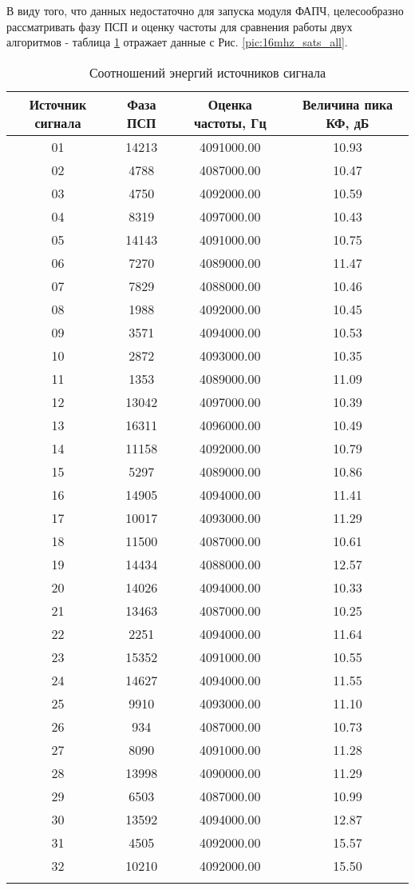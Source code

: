 В виду того, что данных недостаточно для запуска модуля ФАПЧ, целесообразно рассматривать фазу ПСП и оценку частоты для сравнения работы двух
алгоритмов - таблица \ref{tbl:16mhz_sats_all} отражает данные с Рис. \ref{pic:16mhz_sats_all}.
\begin{center}
	\begin{longtable}{ | c | c | c | c |}
	\hline
	Источник сигнала & Фаза ПСП & Оценка частоты, Гц & Величина пика КФ, дБ \\ \hline
	01 & 14213	& 4091000.00	& 10.93 \\ \hline 
	02 & 4788	& 4087000.00	& 10.47 \\ \hline
	03 & 4750	& 4092000.00	& 10.59 \\ \hline
	04 & 8319	& 4097000.00	& 10.43 \\ \hline
	05 & 14143	& 4091000.00	& 10.75 \\ \hline
	06 & 7270	& 4089000.00	& 11.47 \\ \hline
	07 & 7829	& 4088000.00	& 10.46 \\ \hline
	08 & 1988	& 4092000.00	& 10.45 \\ \hline
	09 & 3571	& 4094000.00	& 10.53 \\ \hline
	10 & 2872	& 4093000.00	& 10.35 \\ \hline
	11 & 1353	& 4089000.00	& 11.09 \\ \hline
	12 & 13042	& 4097000.00	& 10.39 \\ \hline
	13 & 16311	& 4096000.00	& 10.49 \\ \hline
	14 & 11158	& 4092000.00	& 10.79 \\ \hline
	15 & 5297	& 4089000.00	& 10.86 \\ \hline
	16 & 14905	& 4094000.00	& 11.41 \\ \hline
	17 & 10017	& 4093000.00	& 11.29 \\ \hline
	18 & 11500	& 4087000.00	& 10.61 \\ \hline
	19 & 14434	& 4088000.00	& 12.57 \\ \hline
	20 & 14026	& 4094000.00	& 10.33 \\ \hline
	21 & 13463	& 4087000.00	& 10.25 \\ \hline
	22 & 2251	& 4094000.00	& 11.64 \\ \hline
	23 & 15352	& 4091000.00	& 10.55 \\ \hline
	24 & 14627	& 4094000.00	& 11.55 \\ \hline
	25 & 9910	& 4093000.00	& 11.10 \\ \hline
	26 & 934	& 4087000.00	& 10.73 \\ \hline
	27 & 8090	& 4091000.00	& 11.28 \\ \hline
	28 & 13998	& 4090000.00	& 11.29 \\ \hline
	29 & 6503	& 4087000.00	& 10.99 \\ \hline
	30 & 13592	& 4094000.00	& 12.87 \\ \hline
	31 & 4505	& 4092000.00	& 15.57 \\ \hline
	32 & 10210	& 4092000.00	& 15.50 \\ \hline
	\caption{Соотношений энергий источников сигнала}
	\label{tbl:16mhz_sats_all}
	\end{longtable}
\end{center}

